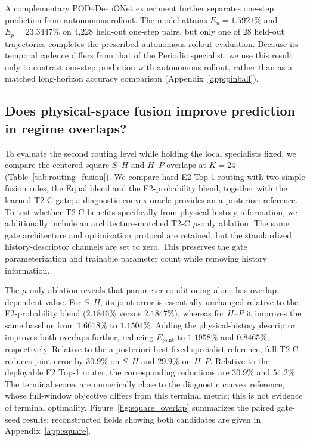 \documentclass{article}
\begin{document}
\par

A complementary POD--DeepONet experiment further separates one-step prediction from autonomous rollout.
The model attains $E_u=1.5921\%$ and $E_p=23.3447\%$ on 4,228 held-out one-step pairs, but only one of 28 held-out trajectories completes the prescribed autonomous rollout evaluation. Because its temporal cadence differs from that of the Periodic specialist, we use this result only to contrast one-step prediction with autonomous rollout, rather than as a matched long-horizon accuracy comparison (Appendix~\ref{app:pinball}).





\subsection{Does physical-space fusion improve prediction in regime overlaps?}
To evaluate the second routing level while holding the local specialists fixed, we compare the centered-square $S$--$H$ and $H$--$P$ overlaps at $K=24$ (Table~\ref{tab:routing_fusion}). We compare hard E2 Top-1 routing with two simple fusion rules, the Equal blend and the E2-probability blend, together with the learned T2-C gate; a diagnostic convex oracle provides an a posteriori reference. To test whether T2-C benefits specifically from physical-history information, we additionally include an architecture-matched T2-C $\mu$-only ablation. The same gate architecture and optimization protocol are retained, but the standardized history-descriptor channels are set to zero. This preserves the gate parameterization and trainable parameter count while removing history information.


The $\mu$-only ablation reveals that parameter conditioning alone has overlap-dependent value. For $S$--$H$, its joint error is essentially unchanged relative to the E2-probability blend ($2.1846\%$ versus $2.1847\%$), whereas for $H$--$P$ it improves the same baseline from $1.6618\%$ to $1.1504\%$. Adding the physical-history descriptor improves both overlaps further, reducing $E_{\mathrm{joint}}$ to $1.1958\%$ and $0.8465\%$, respectively. Relative to the a posteriori best fixed-specialist reference, full T2-C reduces joint error by $30.9\%$ on $S$--$H$ and $29.9\%$ on $H$--$P$. Relative to the deployable E2 Top-1 router, the corresponding reductions are $30.9\%$ and $54.2\%$. The terminal scores are numerically close to the diagnostic convex reference, whose full-window objective differs from this terminal metric; this is not evidence of terminal optimality. Figure~\ref{fig:square_overlap} summarizes the paired gate-seed results; reconstructed fields showing both candidates are given in Appendix~\ref{app:square}.
\end{document}
